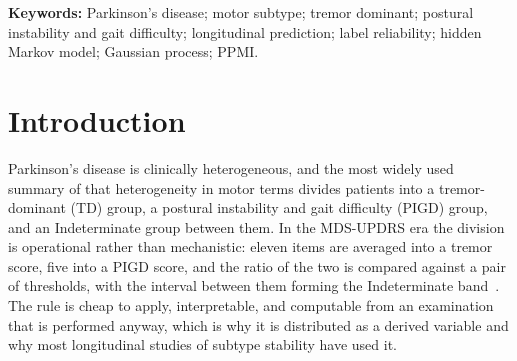 \documentclass[11pt]{article}
\begin{document}
\begin{abstract}
flexible kernel improves on a linear-trend GP ($-0.033$ mean absolute error,
95\% CI $-0.047$ to $-0.021$); but modelled separately, the GP did not beat
persistence on the tremor subscore and was worse on the PIGD subscore.
Converting the subscore GP predictions back to a subtype permits a like-for-like
comparison with the HMM on exactly the same 934 patients and 3,361 points: GP-derived
accuracy was 75.66\% against the HMM's 75.39\%, a paired difference of
$+0.27$ points (95\% CI $-0.42$ to $+0.98$). Four families embodying
substantially different assumptions thus converge on the same held-out
performance, a few points above a trivial rule, and none recovers the
Indeterminate class. With frequent label reversion and a residual spread several
times the band width, this points to the representation of motor symptoms,
rather than model capacity, as the binding constraint. The target is the next
recorded output of a labelling rule, not an independent clinical diagnosis; the
matched comparison is a failure to detect a difference and does not establish
equivalence; no external cohort was used and no clinical utility is claimed.
\end{abstract}

\medskip
\noindent\textbf{Keywords:} Parkinson's disease; motor subtype; tremor dominant;
postural instability and gait difficulty; longitudinal prediction; label
reliability; hidden Markov model; Gaussian process; PPMI.

\section{Introduction}

Parkinson's disease is clinically heterogeneous, and the most widely used
summary of that heterogeneity in motor terms divides patients into a
tremor-dominant (TD) group, a postural instability and gait difficulty (PIGD)
group, and an Indeterminate group between them. In the MDS-UPDRS era the
division is operational rather than mechanistic: eleven items are averaged into
a tremor score, five into a PIGD score, and the ratio of the two is compared
against a pair of thresholds, with the interval between them forming the
Indeterminate band~\citep{stebbins2013,goetz2008}. The rule is cheap to apply,
interpretable, and computable from an examination that is performed anyway,
which is why it is distributed as a derived variable and why most longitudinal
studies of subtype stability have used it.
\end{document}
